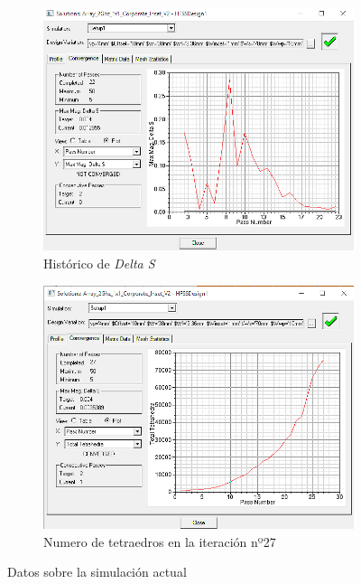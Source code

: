 \begin{figure}[h]
     \centering
     \begin{subfigure}[b]{0.47\textwidth}
         \centering
         \includegraphics[width=\textwidth]{archivos/desarrollo/11a}
         \caption{Histórico de \textit{Delta S}}
         \label{fig:convera}
     \end{subfigure}
     \hfill
     \begin{subfigure}[b]{0.47\textwidth}
         \centering
         \includegraphics[width=\textwidth]{archivos/desarrollo/11b}
         \caption{Numero de tetraedros en la iteración nº27}
         \label{fig:converb}
     \end{subfigure}
     \hfill
        \caption{Datos sobre la simulación actual}
        \label{fig:conver}
\end{figure}

